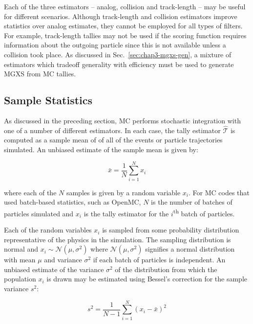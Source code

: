 Each of the three estimators -- analog, collision and track-length -- may be useful for different scenarios. Although track-length and collision estimators improve statistics over analog estimates, they cannot be employed for all types of filters. For example, track-length tallies may not be used if the scoring function requires information about the outgoing particle since this is not available unless a collision took place. As discussed in Sec.~\ref{sec:chap3-mgxs-gen}, a mixture of estimators which tradeoff generality with efficiency must be used to generate \ac{MGXS} from \ac{MC} tallies.


\subsection{Sample Statistics}
\label{subsec:chap3-mc-stats}

As discussed in the preceding section, \ac{MC} performs stochastic integration with one of a number of different estimators. In each case, the tally estimator $\hat{\mathcal{T}}$ is computed as a sample mean of of all of the events or particle trajectories simulated. An unbiased estimate of the sample mean is given by:

\begin{equation}
\label{eqn:chap3-sample-mean}
\bar{x} = \frac{1}{N} \displaystyle\sum\limits_{i=1}^{N} x_{i}
\end{equation}

\noindent where each of the $N$ samples is given by a random variable $x_{i}$. For \ac{MC} codes that used batch-based statistics, such as OpenMC, $N$ is the number of batches of particles simulated and $x_{i}$ is the tally estimator for the $i$\textsuperscript{th} batch of particles. 

Each of the random variables $x_{i}$ is sampled from some probability distribution representative of the physics in the simulation. The sampling distribution is normal and $x_{i} \sim \mathcal{N}(\mu,\sigma^{2})$ where $\mathcal{N}(\mu,\sigma^{2})$ signifies a normal distribution with mean $\mu$ and variance $\sigma^{2}$ if each batch of particles is independent. An unbiased estimate of the variance $\sigma^{2}$ of the distribution from which the population $x_{i}$ is drawn may be estimated using Bessel's correction for the sample variance $s^{2}$:

\begin{equation}
\label{eqn:chap3-variance-sample}
s^{2} = \frac{1}{N-1}\displaystyle\sum\limits_{i=1}^{N}\left(x_{i} - \bar{x}\right)^{2}
\end{equation}

